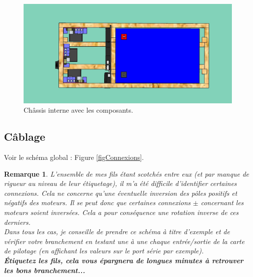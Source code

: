 \documentclass[11pt,a4paper]{article}
\newtheorem*{remarque*}{Remarque}
\begin{document}
\begin{figure}[H]
          \includegraphics[scale=0.22]{ROVInterieurHaut.jpg}
          
          \caption{Châssis interne avec les composants.}
          \label{figChassisComposants}
        \end{figure}

      
      \subsection{Câblage}
        
        Voir le schéma global : Figure \ref{figConnexions}.
          \begin{remarque*}
            L'ensemble de mes fils étant scotchés entre eux (et par manque de rigueur au niveau de leur étiquetage), il m'a été difficile d'identifier certaines connexions. Cela ne concerne qu'une éventuelle inversion des pôles positifs et négatifs des moteurs. Il se peut donc que certaines connexions $\pm$ concernant les moteurs soient inversées. Cela a pour conséquence une rotation inverse de ces derniers. \\
            Dans tous les cas, je conseille de prendre ce schéma à titre d'exemple et de vérifier votre branchement en testant une à une chaque entrée/sortie de la carte de pilotage (en affichant les valeurs sur le port série par exemple).\\
            \textbf{Étiquetez les fils, cela vous épargnera de longues minutes à retrouver les bons branchement...}
          \end{remarque*}
\end{document}
